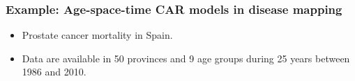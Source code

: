 \documentclass[slidestop,compress,serif,10pt]{beamer}
\begin{document}
\begin{frame}\frametitle{Example: Age-space-time CAR models in disease mapping}
\begin{itemize}
\item Prostate cancer mortality in Spain. 
\item Data are available in 50 provinces and 9 age groups during 25 years between 1986 and 2010.
\end{itemize}
\end{frame}
\end{document}
